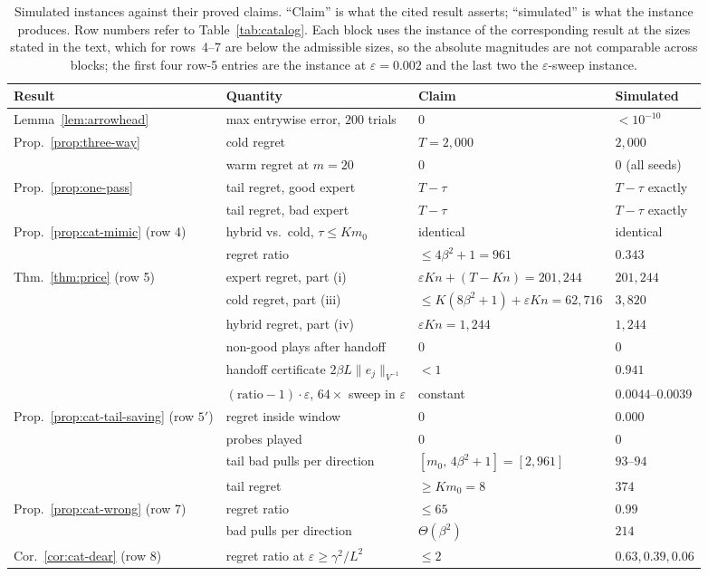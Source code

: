 \documentclass[anon]{alt2027} %
\newcommand{\eps}{\varepsilon}
\begin{document}
\begin{table}[h]
\centering
\caption{Simulated instances against their proved claims. ``Claim'' is what
the cited result asserts; ``simulated'' is what the instance produces. Row
numbers refer to Table~\ref{tab:catalog}. Each block uses the instance of the
corresponding result at the sizes stated in the text, which for rows~4--7 are
below the admissible sizes, so the absolute magnitudes are
not comparable across blocks; the first four row-5 entries are the instance at
$\eps=0.002$ and the last two the $\eps$-sweep instance.}
\label{tab:synthetic}
\small
\setlength{\tabcolsep}{4pt}
\begin{tabular}{@{}llll@{}}
\toprule
Result & Quantity & Claim & Simulated \\
\midrule
Lemma~\ref{lem:arrowhead} & max entrywise error, $200$ trials & $0$ & $<10^{-10}$ \\
\midrule
Prop.~\ref{prop:three-way} & cold regret & $T=2{,}000$ & $2{,}000$ \\
 & warm regret at $m=20$ & $0$ & $0$ (all seeds) \\
Prop.~\ref{prop:one-pass} & tail regret, good expert & $T-\tau$ & $T-\tau$ exactly \\
 & tail regret, bad expert & $T-\tau$ & $T-\tau$ exactly \\
\midrule
Prop.~\ref{prop:cat-mimic} (row 4) & hybrid vs.\ cold, $\tau\le Km_0$ & identical & identical \\
 & regret ratio & $\le4\beta^2+1=961$ & $0.343$ \\
\midrule
Thm.~\ref{thm:price} (row 5) & expert regret, part (i) & $\eps Kn+(T{-}Kn)=201{,}244$ & $201{,}244$ \\
 & cold regret, part (iii) & $\le K(8\beta^2{+}1)+\eps Kn=62{,}716$ & $3{,}820$ \\
 & hybrid regret, part (iv) & $\eps Kn=1{,}244$ & $1{,}244$ \\
 & non-good plays after handoff & $0$ & $0$ \\
 & handoff certificate $2\beta L\|e_j\|_{V^{-1}}$ & $<1$ & $0.941$ \\
 & $(\text{ratio}-1)\cdot\eps$, $64\times$ sweep in $\eps$ & constant & $0.0044$--$0.0039$ \\
\midrule
Prop.~\ref{prop:cat-tail-saving} (row $5'$) & regret inside window & $0$ & $0.000$ \\
 & probes played & $0$ & $0$ \\
 & tail bad pulls per direction & $[m_0,\,4\beta^2{+}1]=[2,961]$ & $93$--$94$ \\
 & tail regret & $\ge Km_0=8$ & $374$ \\
\midrule
Prop.~\ref{prop:cat-wrong} (row 7) & regret ratio & $\le65$ & $0.99$ \\
 & bad pulls per direction & $\Theta(\beta^2)$ & $214$ \\
\midrule
Cor.~\ref{cor:cat-dear} (row 8) & regret ratio at $\eps\ge \gamma^2/L^2$ & $\le2$ & $0.63,0.39,0.06$ \\
\bottomrule
\end{tabular}
\end{table}
\end{document}
